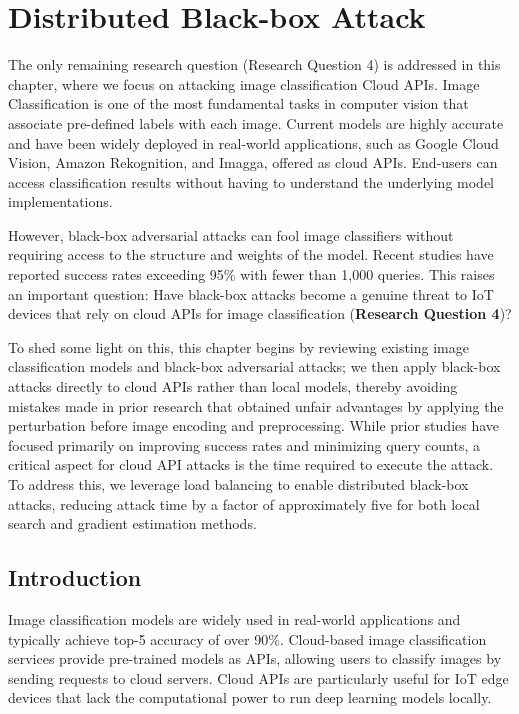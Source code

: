 \chapter{Distributed Black-box Attack}
\label{chpt:classification}


The only remaining research question (Research Question 4) is addressed in this chapter, where we focus on attacking image classification Cloud APIs. Image Classification is one of the most fundamental tasks in computer vision that associate pre-defined labels with each image. Current models are highly accurate and have been widely deployed in real-world applications, such as Google Cloud Vision, Amazon Rekognition, and Imagga, offered as cloud APIs. End-users can access classification results without having to understand the underlying model implementations.

However, black-box adversarial attacks can fool image classifiers without requiring access to the structure and weights of the model.  Recent studies have reported success rates exceeding 95\% with fewer than 1,000 queries. This raises an important question: Have black-box attacks become a genuine threat to IoT devices that rely on cloud APIs for image classification (\textbf{Research Question 4})?

To shed some light on this, this chapter begins by reviewing existing image classification models and black-box adversarial attacks; we then apply black-box attacks directly to cloud APIs rather than local models, thereby avoiding mistakes made in prior research that obtained unfair advantages by applying the perturbation before image encoding and preprocessing. While prior studies have focused primarily on improving success rates and minimizing query counts, a critical aspect for cloud API attacks is the time required to execute the attack. To address this, we leverage load balancing to enable distributed black-box attacks, reducing attack time by a factor of approximately five for both local search and gradient estimation methods.

\section{Introduction}
\label{sec:introduction}
Image classification models are widely used in real-world applications and typically achieve top-5 accuracy of over 90\%. Cloud-based image classification services provide pre-trained models as APIs, allowing users to classify images by sending requests to cloud servers. Cloud APIs are particularly useful for IoT edge devices that lack the computational power to run deep learning models locally.

